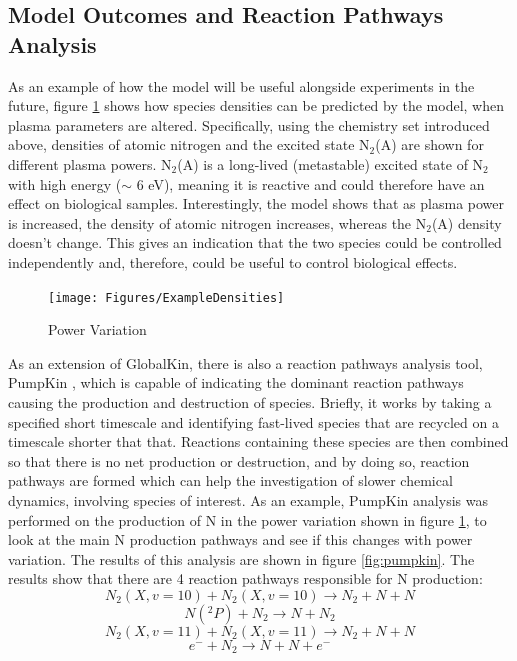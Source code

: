 \documentclass[11pt, oneside]{article}   	%
\begin{document}
\subsection{Model Outcomes and Reaction Pathways Analysis}

As an example of how the model will be useful alongside experiments in the future, figure \ref{fig:ExamplePowerVar} shows how species densities can be predicted by the model, when plasma parameters are altered.
Specifically, using the chemistry set introduced above, densities of atomic nitrogen and the excited state N$_2$(A) are shown for different plasma powers.
N$_2$(A) is a long-lived (metastable) excited state of N$_2$ with high energy ($\sim$ 6 eV), meaning it is reactive and could therefore have an effect on biological samples.
Interestingly, the model shows that as plasma power is increased, the density of atomic nitrogen increases, whereas the N$_2$(A) density doesn't change.
This gives an indication that the two species could be controlled independently and, therefore, could be useful to control biological effects.

\begin{figure}
\texttt{[image: Figures/ExampleDensities]}
\caption{Power Variation}
\label{fig:ExamplePowerVar}
\end{figure}


As an extension of GlobalKin, there is also a reaction pathways analysis tool, PumpKin \cite{Markosyan2014pumpkin}, which is capable of indicating the dominant reaction pathways causing the production and destruction of species.
Briefly, it works by taking a specified short timescale and identifying fast-lived species that are recycled on a timescale shorter that that.
Reactions containing these species are then combined so that there is no net production or destruction, and by doing so, reaction pathways are formed which can help the investigation of slower chemical dynamics, involving species of interest.
As an example, PumpKin analysis was performed on the production of N in the power variation shown in figure \ref{fig:ExamplePowerVar}, to look at the main N production pathways and see if this changes with power variation.
The results of this analysis are shown in figure \ref{fig:pumpkin}.
The results show that there are 4 reaction pathways responsible for N production:
\begin{equation}
N_2(X, v=10) + N_2(X, v=10) \rightarrow N_2 + N + N
\label{eqn1}
\end{equation}
\begin{equation}
N(^2P) + N_2 \rightarrow N + N_2
\label{eqn2}
\end{equation}
\begin{equation}
N_2(X, v=11) + N_2(X, v=11) \rightarrow N_2 + N + N
\label{eqn3}
\end{equation}
\begin{equation}
e^- + N_2 \rightarrow  N + N + e^-
\label{eqn4}
\end{equation}
\end{document}
